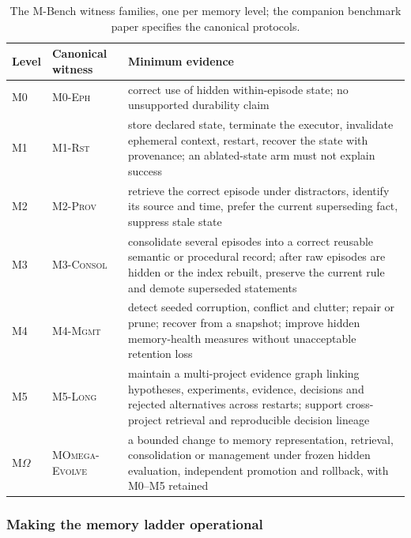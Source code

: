 \documentclass[11pt]{article}
\theoremstyle{definition}
\newcommand{\Om}{\ensuremath{\Omega}}
\begin{document}
\begin{table}[!htbp]
\centering\small
\begin{tabularx}{\textwidth}{@{}llY@{}}
\toprule
Level & Canonical witness & Minimum evidence \\
\midrule
M0 & \textsc{M0-Eph} & correct use of hidden within-episode state; no unsupported durability claim \\
M1 & \textsc{M1-Rst} & store declared state, terminate the executor, invalidate ephemeral context, restart, recover the state with provenance; an ablated-state arm must not explain success \\
M2 & \textsc{M2-Prov} & retrieve the correct episode under distractors, identify its source and time, prefer the current superseding fact, suppress stale state \\
M3 & \textsc{M3-Consol} & consolidate several episodes into a correct reusable semantic or procedural record; after raw episodes are hidden or the index rebuilt, preserve the current rule and demote superseded statements \\
M4 & \textsc{M4-Mgmt} & detect seeded corruption, conflict and clutter; repair or prune; recover from a snapshot; improve hidden memory-health measures without unacceptable retention loss \\
M5 & \textsc{M5-Long} & maintain a multi-project evidence graph linking hypotheses, experiments, evidence, decisions and rejected alternatives across restarts; support cross-project retrieval and reproducible decision lineage \\
M\Om{} & \textsc{MOmega-Evolve} & a bounded change to memory representation, retrieval, consolidation or management under frozen hidden evaluation, independent promotion and rollback, with M0--M5 retained \\
\bottomrule
\end{tabularx}
\caption{The M-Bench witness families, one per memory level; the companion benchmark paper specifies the canonical protocols.}
\label{tab:mbench}
\end{table}

\subsubsection{Making the memory ladder operational}\label{sec:mops}
\end{document}

